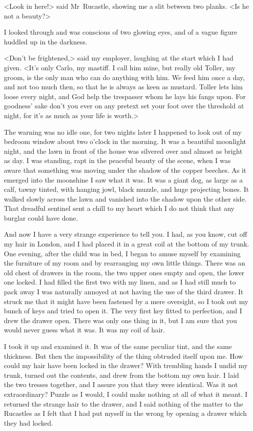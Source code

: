 <Look in here!> said Mr~Rucastle, showing me a slit between two planks. <Is he not a beauty?>

I looked through and was conscious of two glowing eyes, and of a vague figure huddled up in the darkness.

<Don't be frightened,> said my employer, laughing at the start which I had given. <It's only Carlo, my mastiff. I call him mine, but really old Toller, my groom, is the only man who can do anything with him. We feed him once a day, and not too much then, so that he is always as keen as mustard. Toller lets him loose every night, and God help the trespasser whom he lays his fangs upon. For goodness' sake don't you ever on any pretext set your foot over the threshold at night, for it's as much as your life is worth.>

The warning was no idle one, for two nights later I happened to look out of my bedroom window about two o'clock in the morning. It was a beautiful moonlight night, and the lawn in front of the house was silvered over and almost as bright as day. I was standing, rapt in the peaceful beauty of the scene, when I was aware that something was moving under the shadow of the copper beeches. As it emerged into the moonshine I saw what it was. It was a giant dog, as large as a calf, tawny tinted, with hanging jowl, black muzzle, and huge projecting bones. It walked slowly across the lawn and vanished into the shadow upon the other side. That dreadful sentinel sent a chill to my heart which I do not think that any burglar could have done.

And now I have a very strange experience to tell you. I had, as you know, cut off my hair in London, and I had placed it in a great coil at the bottom of my trunk. One evening, after the child was in bed, I began to amuse myself by examining the furniture of my room and by rearranging my own little things. There was an old chest of drawers in the room, the two upper ones empty and open, the lower one locked. I had filled the first two with my linen, and as I had still much to pack away I was naturally annoyed at not having the use of the third drawer. It struck me that it might have been fastened by a mere oversight, so I took out my bunch of keys and tried to open it. The very first key fitted to perfection, and I drew the drawer open. There was only one thing in it, but I am sure that you would never guess what it was. It was my coil of hair.

I took it up and examined it. It was of the same peculiar tint, and the same thickness. But then the impossibility of the thing obtruded itself upon me. How could my hair have been locked in the drawer? With trembling hands I undid my trunk, turned out the contents, and drew from the bottom my own hair. I laid the two tresses together, and I assure you that they were identical. Was it not extraordinary? Puzzle as I would, I could make nothing at all of what it meant. I returned the strange hair to the drawer, and I said nothing of the matter to the Rucastles as I felt that I had put myself in the wrong by opening a drawer which they had locked.

